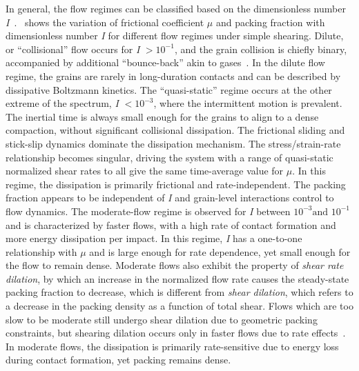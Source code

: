 In general, the flow regimes can be classified based on the dimensionless 
number \textit{I}~\citep{DaCruz2005}.~ shows the variation of 
frictional coefficient $\mu$ and packing fraction with dimensionless 
number \textit{I} for different flow regimes under simple shearing. Dilute, or 
``collisional'' flow occurs for \textit{I} $>10^{-1}$, and the grain collision 
is chiefly binary, accompanied  by additional ``bounce-back'' akin to 
gases~\citep{Kamrin2008}. In the dilute flow regime, the grains are rarely in 
long-duration contacts and can be described by dissipative Boltzmann kinetics. 
The ``quasi-static'' regime occurs at the other extreme of the spectrum, 
\textit{I} $<10^{-3}$, where the intermittent motion is prevalent. The inertial 
time is always small enough for the grains to align to a dense compaction, 
without significant collisional dissipation. The frictional sliding and 
stick-slip dynamics dominate the dissipation mechanism. The stress/strain-rate 
relationship becomes singular, driving the system with a range of quasi-static 
normalized shear rates to all give the same time-average value for $\mu$. In 
this regime, the dissipation is primarily frictional and rate-independent. The 
packing fraction appears to be independent of \textit{I} and grain-level 
interactions control to flow dynamics. The moderate-flow regime is observed for 
\textit{I} between $10^{-3} \mbox{and }10^{-1}$ and is characterized by faster 
flows, with a high rate of contact formation and more energy dissipation per 
impact. 
In this regime, \textit{I} has a one-to-one relationship with $\mu$ and is 
large 
enough for rate dependence, yet small enough for the flow to remain dense. 
Moderate flows also exhibit the property of \textit{shear rate dilation}, 
by which an increase in the normalized flow rate causes the steady-state 
packing fraction to decrease, which is different from \textit{shear dilation}, 
which refers to a decrease in the packing density as a function of total shear. 
Flows which are too slow to be moderate still undergo shear dilation due to 
geometric packing constraints, but shearing dilation occurs only in faster 
flows due to rate effects~\citep{Kamrin2008}. In moderate flows, the 
dissipation is primarily rate-sensitive due to energy loss during contact 
formation, yet packing remains dense.

